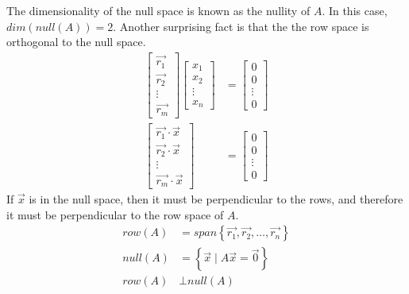 \documentclass{math}
\begin{document}
The dimensionality of the null space is known as the nullity of \( A \). In this
case, \( dim(null(A)) = 2 \). Another surprising fact is that the the row space
is orthogonal to the null space.
\begin{align*}
  \begin{bmatrix}\vec{r_1} \\ \vec{r_2} \\ \vdots \\ \vec{r_m}\end{bmatrix}
    \begin{bmatrix}x_1 \\ x_2 \\ \vdots \\ x_n\end{bmatrix} &=
    \begin{bmatrix}0 \\ 0 \\ \vdots \\ 0\end{bmatrix} \\
  \begin{bmatrix}
    \vec{r_1}\cdot\vec{x} \\
    \vec{r_2}\cdot\vec{x} \\
    \vdots \\
    \vec{r_m}\cdot\vec{x}
  \end{bmatrix} &= \begin{bmatrix}0 \\ 0 \\ \vdots \\ 0\end{bmatrix}
\end{align*}
If \( \vec{x} \) is in the null space, then it must be perpendicular to the
rows, and therefore it must be perpendicular to the row space of \( A \).
\begin{align*}
  row(A) &= span\left\{\vec{r_1},\vec{r_2},\dots,\vec{r_n}\right\} \\
  null(A) &= \left\{\vec{x}\mid A\vec{x} = \vec{0}\right\} \\
  row(A) &\bot null(A)
\end{align*}
\end{document}
